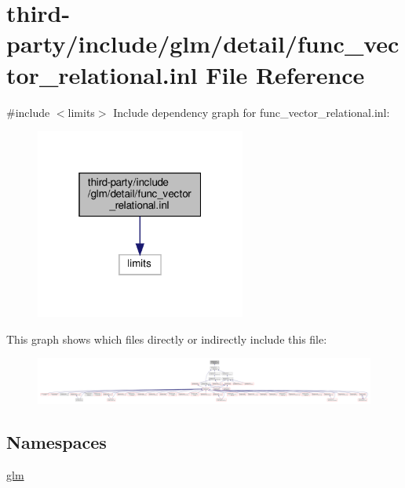 \hypertarget{func__vector__relational_8inl}{}\section{third-\/party/include/glm/detail/func\+\_\+vector\+\_\+relational.inl File Reference}
\label{func__vector__relational_8inl}
{\ttfamily \#include $<$limits$>$}\newline
Include dependency graph for func\+\_\+vector\+\_\+relational.\+inl\+:
\nopagebreak
\begin{figure}[H]
\begin{center}
\leavevmode
\includegraphics[width=196pt]{func__vector__relational_8inl__incl}
\end{center}
\end{figure}
This graph shows which files directly or indirectly include this file\+:
\nopagebreak
\begin{figure}[H]
\begin{center}
\leavevmode
\includegraphics[width=350pt]{func__vector__relational_8inl__dep__incl}
\end{center}
\end{figure}
\subsection*{Namespaces}
\begin{DoxyCompactItemize}
\item 
 \hyperlink{namespaceglm}{glm}
\end{DoxyCompactItemize}

